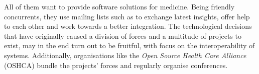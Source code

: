 All of them want to provide software solutions for medicine. Being friendly
concurrents, they use mailing lists such as \cite{openhealth} to exchange
latest insights, offer help to each other and work towards a better integration.
The technological decisions that have originally caused a division of forces
and a multitude of projects to exist, may in the end turn out to be fruitful,
with focus on the interoperability of systems. Additionally, organisations like
the \emph{Open Source Health Care Alliance} (OSHCA) \cite{oshca} bundle the
projects' forces and regularly organise conferences.
